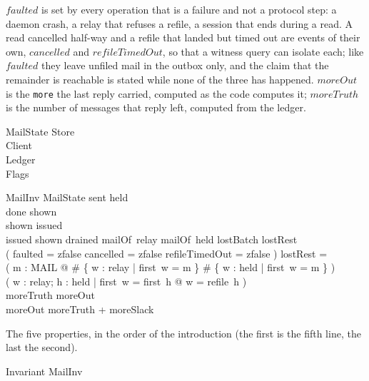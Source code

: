 \documentclass[a4paper,10pt,fleqn]{article}
\begin{document}
$faulted$ is set by every operation that is a failure and not a protocol
step: a daemon crash, a relay that refuses a refile, a session that ends
during a read.  A read cancelled half-way and a refile that landed but timed
out are events of their own, $cancelled$ and $refileTimedOut$, so that a
witness query can isolate each; like $faulted$ they leave unfiled mail in the
outbox only, and the claim that the remainder is reachable is stated while
none of the three has happened.  $moreOut$ is the \texttt{more}
the last reply carried, computed as the code computes it; $moreTruth$ is the
number of messages that reply left, computed from the ledger.

\begin{schema}{MailState}
  Store \\
  Client \\
  Ledger \\
  Flags
\end{schema}

\begin{schema}{MailInv}
  MailState
  \where
  sent \subseteq held \\
  done \subseteq shown \\
  shown \subseteq issued \\
  issued \subseteq shown \cup drained \cup mailOf~relay \cup mailOf~held \cup
    lostBatch \cup lostRest \\
  ( faulted = zfalse \land cancelled = zfalse \land refileTimedOut = zfalse )
    \implies lostRest = \emptyset \\
  ( \forall m : MAIL @ \# \{ w : relay | first~w = m \}  \land
    \# \{ w : held | first~w = m \}  ) \\
  ( \forall w : relay; h : held | first~w = first~h @ w = refile~h ) \\
  moreTruth \leq moreOut \\
  moreOut \leq moreTruth + moreSlack
\end{schema}

The five properties, in the order of the introduction (the first is the
fifth line, the last the second).

\begin{schema}{Invariant}
  MailInv
\end{schema}
\end{document}

